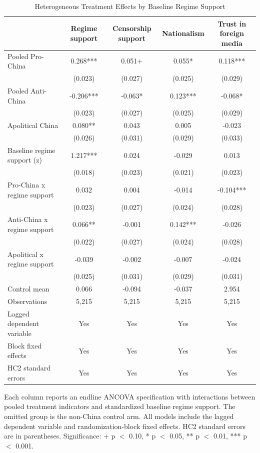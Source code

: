 \begin{table}[H]
\centering
\caption{Heterogeneous Treatment Effects by Baseline Regime Support}
\label{tab:het_rs_t1}
\footnotesize
\begin{threeparttable}
\begin{tabular}{lcccc}
\toprule
 & Regime support & Censorship support & Nationalism & Trust in foreign media \\
\midrule
Pooled Pro-China & 0.268*** & 0.051+ & 0.055* & 0.118*** \\
 & (0.023) & (0.027) & (0.025) & (0.029) \\
\addlinespace
Pooled Anti-China & -0.206*** & -0.063* & 0.123*** & -0.068* \\
 & (0.023) & (0.027) & (0.025) & (0.029) \\
\addlinespace
Apolitical China & 0.080** & 0.043 & 0.005 & -0.023 \\
 & (0.026) & (0.031) & (0.029) & (0.033) \\
\addlinespace
Baseline regime support (z) & 1.217*** & 0.024 & -0.029 & 0.013 \\
 & (0.018) & (0.023) & (0.021) & (0.023) \\
\addlinespace
Pro-China x regime support & 0.032 & 0.004 & -0.014 & -0.104*** \\
 & (0.023) & (0.027) & (0.024) & (0.028) \\
\addlinespace
Anti-China x regime support & 0.066** & -0.001 & 0.142*** & -0.026 \\
 & (0.022) & (0.027) & (0.024) & (0.028) \\
\addlinespace
Apolitical x regime support & -0.039 & -0.002 & -0.007 & -0.024 \\
 & (0.025) & (0.031) & (0.029) & (0.031) \\
\addlinespace
\midrule
Control mean & 0.066 & -0.094 & -0.037 & 2.954 \\
Observations & 5,215 & 5,215 & 5,215 & 5,215 \\
Lagged dependent variable & Yes & Yes & Yes & Yes \\
Block fixed effects & Yes & Yes & Yes & Yes \\
HC2 standard errors & Yes & Yes & Yes & Yes \\
\bottomrule
\end{tabular}
\begin{tablenotes}[flushleft]
\footnotesize
\item Each column reports an endline ANCOVA specification with interactions between pooled treatment indicators and standardized baseline regime support. The omitted group is the non-China control arm. All models include the lagged dependent variable and randomization-block fixed effects. HC2 standard errors are in parentheses. Significance: + p $<$ 0.10, * p $<$ 0.05, ** p $<$ 0.01, *** p $<$ 0.001.
\end{tablenotes}
\end{threeparttable}
\end{table}
